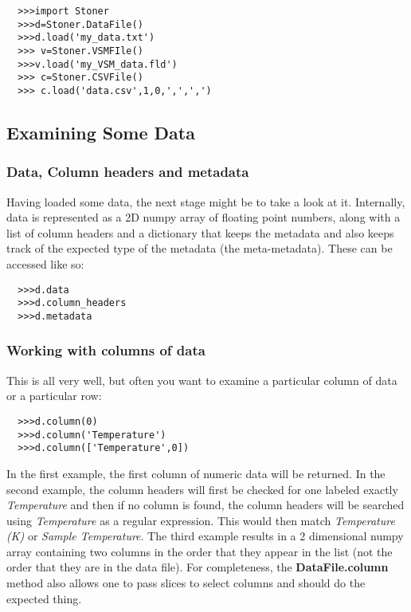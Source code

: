 \documentclass[a4paper,11pt]{scrartcl}
\begin{document}
\begin{verbatim}
  >>>import Stoner
  >>>d=Stoner.DataFile()
  >>>d.load('my_data.txt')
  >>> v=Stoner.VSMFIle()
  >>>v.load('my_VSM_data.fld')
  >>> c=Stoner.CSVFile()
  >>> c.load('data.csv',1,0,',',',')
\end{verbatim}


\subsection{Examining Some Data}
\subsubsection{Data, Column headers and metadata}
Having loaded some data, the next stage might be to take a look at it.
Internally, data is represented as a 2D numpy array of floating point numbers,
along with a list of column headers and a dictionary that keeps the metadata and
also keeps track of the expected type of the metadata (\ie the meta-metadata).
These can be accessed like so:
\begin{verbatim}
  >>>d.data
  >>>d.column_headers
  >>>d.metadata
\end{verbatim}

\subsubsection{Working with columns of data}

This is all very well, but often you want to examine a particular column of data
or a particular row:
\begin{verbatim}
  >>>d.column(0)
  >>>d.column('Temperature')
  >>>d.column(['Temperature',0])
\end{verbatim}
In the first example, the first column of numeric data will be returned. In the
second example, the column headers will first be checked for one labeled exactly
\textit{Temperature} and then if no column is found, the column headers will be
searched using \textit{Temperature} as a regular expression. This would then
match \textit{Temperature (K)} or \textit{Sample Temperature}.  The third
example results in a 2 dimensional numpy array containing two columns in the
order that they appear in the list (\ie not the order that they are in the data
file). For completeness, the \textbf{DataFile.column} method also allows one to
pass slices to select columns and should do the expected thing.
\end{document}
